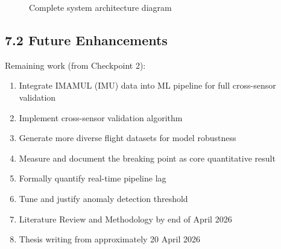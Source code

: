\begin{figure}[htbp]
    \centering
    \caption{Complete system architecture diagram}
    \label{fig:full_architecture}
\end{figure}

\subsection{7.2 Future Enhancements}

Remaining work (from Checkpoint 2):

\begin{enumerate}
    \item Integrate IMAMUL (IMU) data into ML pipeline for full cross-sensor validation
    \item Implement cross-sensor validation algorithm
    \item Generate more diverse flight datasets for model robustness
    \item Measure and document the breaking point as core quantitative result
    \item Formally quantify real-time pipeline lag
    \item Tune and justify anomaly detection threshold
    \item Literature Review and Methodology by end of April 2026
    \item Thesis writing from approximately 20 April 2026
\end{enumerate}

